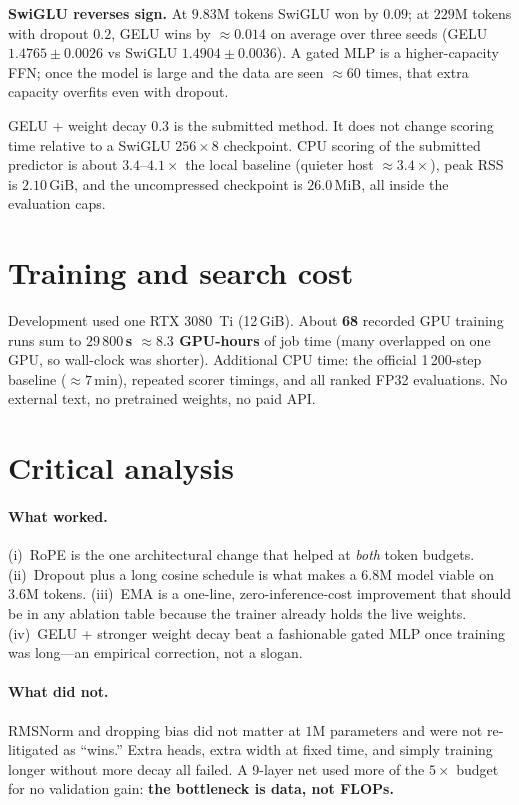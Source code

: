 \documentclass[11pt,a4paper]{article}
\begin{document}
\textbf{SwiGLU reverses sign.} At $9.83$M tokens SwiGLU won by $0.09$; at $229$M tokens with dropout $0.2$, GELU wins by $\approx 0.014$ on average over three seeds (GELU $1.4765\pm 0.0026$ vs SwiGLU $1.4904\pm 0.0036$). A gated MLP is a higher-capacity FFN; once the model is large and the data are seen $\approx 60$ times, that extra capacity overfits even with dropout.

GELU + weight decay $0.3$ is the submitted method. It does not change scoring time relative to a SwiGLU $256\times 8$ checkpoint. CPU scoring of the submitted predictor is about $3.4$--$4.1\times$ the local baseline (quieter host $\approx 3.4\times$), peak RSS is $2.10$\,GiB, and the uncompressed checkpoint is $26.0$\,MiB, all inside the evaluation caps.

\section{Training and search cost}

Development used one RTX 3080~Ti (12\,GiB). About \textbf{68} recorded GPU training runs sum to \textbf{$29\,800$\,s $\approx 8.3$ GPU-hours} of job time (many overlapped on one GPU, so wall-clock was shorter). Additional CPU time: the official 1\,200-step baseline ($\approx 7$\,min), repeated scorer timings, and all ranked FP32 evaluations. No external text, no pretrained weights, no paid API.

\section{Critical analysis}

\paragraph{What worked.}
(i)~RoPE is the one architectural change that helped at \emph{both} token budgets.
(ii)~Dropout plus a long cosine schedule is what makes a $6.8$M model viable on $3.6$M tokens.
(iii)~EMA is a one-line, zero-inference-cost improvement that should be in any ablation table because the trainer already holds the live weights.
(iv)~GELU + stronger weight decay beat a fashionable gated MLP once training was long---an empirical correction, not a slogan.

\paragraph{What did not.}
RMSNorm and dropping bias did not matter at $1$M parameters and were not re-litigated as ``wins.'' Extra heads, extra width at fixed time, and simply training longer without more decay all failed. A 9-layer net used more of the $5\times$ budget for no validation gain: \textbf{the bottleneck is data, not FLOPs.}
\end{document}

